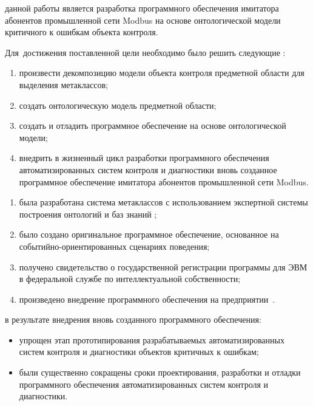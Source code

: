 {\aim} данной работы является разработка программного обеспечения 
  имитатора абонентов промышленной сети Modbus на основе онтологической модели критичного к ошибкам объекта контроля.

Для~достижения поставленной цели необходимо было решить следующие {\tasks}:
\begin{enumerate}
  \item произвести декомпозицию модели объекта контроля предметной области для выделения метаклассов;
  \item создать онтологическую модель предметной области;
  \item создать и отладить программное обеспечение на основе онтологической модели;
  \item внедрить в жизненный цикл разработки программного обеспечения автоматизированных систем контроля и диагностики
        вновь созданное программное обеспечение имитатора абонентов промышленной сети Modbus.
\end{enumerate}


{\novelty}
\begin{enumerate}
  \item была разработана система метаклассов с использованием экспертной системы построения онтологий и баз знаний \protege;
  \item было создано оригинальное программное обеспечение, основанное на событийно-ориентированных сценариях поведения;
  \item получено свидетельство о государственной регистрации программы для ЭВМ в федеральной службе по интеллектуальной собственности;
  \item произведено внедрение программного обеспечения на предприятии~\leadingOrganizationTitle.
\end{enumerate}

{\influence} в результате внедрения вновь созданного программного обеспечения:
\begin{itemize}
  \item упрощен этап прототипирования разрабатываемых автоматизированных систем контроля и диагностики объектов критичных к ошибкам;
  \item были существенно сокращены сроки проектирования, разработки и отладки программного обеспечения автоматизированных систем контроля и диагностики.
\end{itemize}


